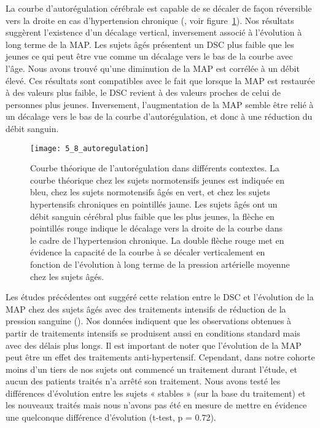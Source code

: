 La courbe d’autorégulation cérébrale est capable de se décaler de façon réversible vers la
droite en cas d’hypertension chronique (\cite{Traon2002}, voir figure~\ref{fig:5_8_autoregulation}). Nos résultats suggèrent l’existence d’un
décalage vertical, inversement associé à l’évolution à long terme de la MAP. Les sujets âgés présentent
un DSC plus faible que les jeunes ce qui peut être vue comme un décalage vers le bas de la courbe avec
l’âge. Nous avons trouvé qu’une diminution de la MAP est corrélée à un débit élevé. Ces résultats sont
compatibles avec le fait que lorsque la MAP est restaurée à des valeurs plus faible, le DSC revient à des
valeurs proches de celui de personnes plus jeunes. Inversement, l’augmentation de la MAP semble
être relié à un décalage vers le bas de la courbe d’autorégulation, et donc à une réduction du débit
sanguin.

\begin{figure}[!t]
\centering
\texttt{[image: 5\_8\_autoregulation]}
\caption{Courbe théorique de l'autorégulation dans différents contextes. La courbe théorique chez les sujets normotensifs
jeunes est indiquée en bleu, chez les sujets normotensifs âgés en vert, et chez les sujets hypertensifs chroniques en pointillés
jaune. Les sujets âgés ont un débit sanguin cérébral plus faible que les plus jeunes, la flèche en pointillés rouge indique le
décalage vers la droite de la courbe dans le cadre de l’hypertension chronique. La double flèche rouge met en évidence la
capacité de la courbe à se décaler verticalement en fonction de l’évolution à long terme de la pression artérielle moyenne
chez les sujets âgés.}
\label{fig:5_8_autoregulation}	
\end{figure}
Les études précédentes ont suggéré cette relation entre le DSC et l’évolution de la MAP chez
des sujets âgés avec des traitements intensifs de réduction de la pression sanguine (\cite{Tryambake2013}). Nos données
indiquent que les observations obtenues à partir de traitements intensifs se produisent aussi en
conditions standard mais avec des délais plus longs. Il est important de noter que l’évolution de la MAP
peut être un effet des traitements anti-hypertensif. Cependant, dans notre cohorte moins d’un tiers
de nos sujets ont commencé un traitement durant l’étude, et aucun des patients traités n’a arrêté son
traitement. Nous avons testé les différences d’évolution entre les sujets « stables » (sur la base du
traitement) et les nouveaux traités mais nous n’avons pas été en mesure de mettre en évidence une
quelconque différence d’évolution (t-test, p = 0.72).

